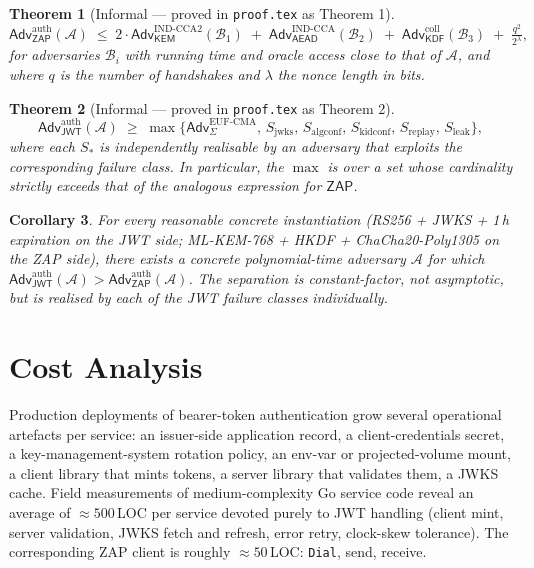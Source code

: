 \documentclass[11pt,a4paper]{article}
\theoremstyle{plain}
\newtheorem{theorem}{Theorem}
\newtheorem{corollary}[theorem]{Corollary}
\theoremstyle{definition}
\newcommand{\Adv}{\mathsf{Adv}}
\newcommand{\KEM}{\mathsf{KEM}}
\newcommand{\KDF}{\mathsf{KDF}}
\newcommand{\AEAD}{\mathsf{AEAD}}
\newcommand{\JWT}{\mathsf{JWT}}
\newcommand{\ZAP}{\mathsf{ZAP}}
\begin{document}
\begin{theorem}[Informal --- proved in \texttt{proof.tex} as Theorem 1]
\label{thm:zap}
\[
\Adv_{\ZAP}^{\text{auth}}(\mathcal{A}) \;\le\;
2 \cdot \Adv_{\KEM}^{\mathrm{IND\text{-}CCA2}}(\mathcal{B}_1) \;+\;
\Adv_{\AEAD}^{\mathrm{IND\text{-}CCA}}(\mathcal{B}_2) \;+\;
\Adv_{\KDF}^{\mathrm{coll}}(\mathcal{B}_3) \;+\; \tfrac{q^2}{2^\lambda},
\]
for adversaries $\mathcal{B}_i$ with running time and oracle access close
to that of $\mathcal{A}$, and where $q$ is the number of handshakes and
$\lambda$ the nonce length in bits.
\end{theorem}

\begin{theorem}[Informal --- proved in \texttt{proof.tex} as Theorem 2]
\label{thm:jwt}
\[
\Adv_{\JWT}^{\text{auth}}(\mathcal{A}) \;\ge\; \max\Big\{
\Adv_{\Sigma}^{\mathrm{EUF\text{-}CMA}},\,
S_{\text{jwks}},\,
S_{\text{algconf}},\,
S_{\text{kidconf}},\,
S_{\text{replay}},\,
S_{\text{leak}}
\Big\},
\]
where each $S_{*}$ is independently realisable by an adversary that
exploits the corresponding failure class. In particular, the
$\max$ is over a set whose cardinality strictly exceeds that of the
analogous expression for $\ZAP$.
\end{theorem}

\begin{corollary}
\label{cor:dom}
For every reasonable concrete instantiation (RS256 + JWKS + 1\,h
expiration on the JWT side; ML-KEM-768 + HKDF + ChaCha20-Poly1305 on the
ZAP side), there exists a concrete polynomial-time adversary
$\mathcal{A}$ for which
$\Adv_{\JWT}^{\text{auth}}(\mathcal{A}) > \Adv_{\ZAP}^{\text{auth}}(\mathcal{A})$.
The separation is constant-factor, not asymptotic, but is realised by
each of the JWT failure classes individually.
\end{corollary}

\section{Cost Analysis}
\label{sec:cost}

Production deployments of bearer-token authentication grow several
operational artefacts per service: an issuer-side application record, a
client-credentials secret, a key-management-system rotation policy, an
env-var or projected-volume mount, a client library that mints tokens, a
server library that validates them, a JWKS cache. Field measurements of
medium-complexity Go service code reveal an average of
$\approx 500$\,LOC per service devoted purely to JWT handling
(client mint, server validation, JWKS fetch and refresh, error retry,
clock-skew tolerance). The corresponding ZAP client is roughly
$\approx 50$\,LOC: \texttt{Dial}, send, receive.
\end{document}
